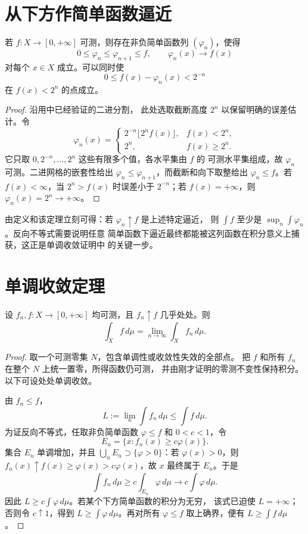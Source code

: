 \section{从下方作简单函数逼近}

\begin{theorem}[非负可测函数的简单逼近]
\label{thm:nonnegative-simple-approximation}
若 \(f:X\to[0,+\infty]\) 可测，则存在非负简单函数列
\((\varphi_n)\)，使得
\[
 0\le\varphi_n\le\varphi_{n+1}\le f,\qquad
 \varphi_n(x)\longrightarrow f(x)
\]
对每个 \(x\in X\) 成立。可以同时使
\[
 0\le f(x)-\varphi_n(x)<2^{-n}
\]
在 \(f(x)<2^n\) 的点成立。
\end{theorem}

\begin{proof}
沿用中已经验证的二进分割，
此处选取截断高度 \(2^n\) 以保留明确的误差估计。令
\[
 \varphi_n(x)=
 \begin{cases}
 2^{-n}\lfloor 2^nf(x)\rfloor,& f(x)<2^n,\\
 2^n,& f(x)\ge2^n.
 \end{cases}
\]
它只取 \(0,2^{-n},\ldots,2^n\) 这些有限多个值，各水平集由 \(f\) 的
可测水平集组成，故 \(\varphi_n\) 可测。二进网格的嵌套性给出
\(\varphi_n\le\varphi_{n+1}\)，而截断和向下取整给出
\(\varphi_n\le f\)。若 \(f(x)<\infty\)，当 \(2^n>f(x)\) 时误差小于
\(2^{-n}\)；若 \(f(x)=+\infty\)，则 \(\varphi_n(x)=2^n\to+\infty\)。
\end{proof}

由定义和该定理立刻可得：若 \(\varphi_n\uparrow f\) 是上述特定逼近，
则 \(\int f\) 至少是 \(\sup_n\int\varphi_n\)。反向不等式需要说明任意
简单函数下逼近最终都能被这列函数在积分意义上捕获，这正是单调收敛证明中
的关键一步。

\section{单调收敛定理}

\begin{theorem}
\label{thm:monotone-convergence}
设 \(f_n,f:X\to[0,+\infty]\) 均可测，且 \(f_n\uparrow f\) 几乎处处。则
\[
 \int_X f\,d\mu=\lim_{n\to\infty}\int_X f_n\,d\mu .
\]
\end{theorem}

\begin{proof}
取一个可测零集 \(N\)，包含单调性或收敛性失效的全部点。
把 \(f\) 和所有 \(f_n\) 在整个 \(N\) 上统一置零，所得函数仍可测，
并由刚才证明的零测不变性保持积分。以下可设处处单调收敛。

由 \(f_n\le f\)，
\[
 L:=\lim_n\int f_n\,d\mu\le\int f\,d\mu .
\]
为证反向不等式，任取非负简单函数 \(\varphi\le f\) 和 \(0<c<1\)，令
\[
 E_n=\{x:f_n(x)\ge c\varphi(x)\}.
\]
集合 \(E_n\) 单调增加，并且
\(\bigcup_nE_n\supset\{\varphi>0\}\)：若 \(\varphi(x)>0\)，则
\(f_n(x)\uparrow f(x)\ge\varphi(x)>c\varphi(x)\)，故 \(x\) 最终属于
\(E_n\)。于是
\[
 \int f_n\,d\mu\ge c\int_{E_n}\varphi\,d\mu
 \longrightarrow c\int\varphi\,d\mu .
\]
因此 \(L\ge c\int\varphi\,d\mu\)。若某个下方简单函数的积分为无穷，
该式已迫使 \(L=+\infty\)；否则令 \(c\uparrow1\)，得到
\(L\ge\int\varphi\,d\mu\)。再对所有 \(\varphi\le f\) 取上确界，便有
\(L\ge\int f\,d\mu\)。
\end{proof}

